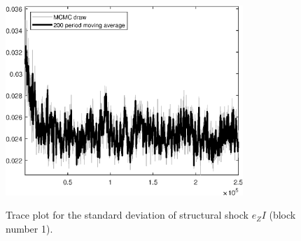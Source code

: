 \begin{figure}[H]
\centering
  \includegraphics[width=0.8\textwidth]{BRS/graphs/TracePlot_SE_e_ZI_blck_1}\\
    \caption{Trace plot for the standard deviation of structural shock ${e_ZI}$ (block number 1).}
\end{figure}
